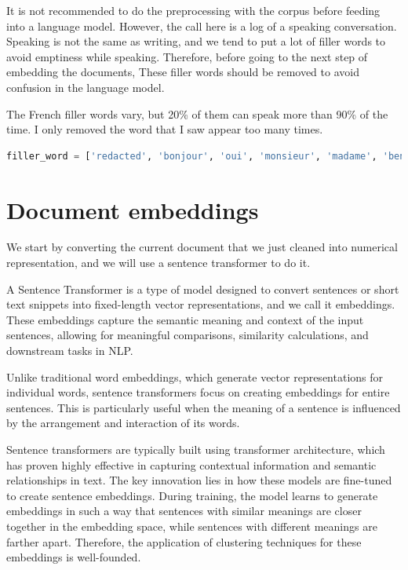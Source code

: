 It is not recommended to do the preprocessing with the corpus before feeding into a language model. However, the call here is a log of a speaking conversation. Speaking is not the same as writing, and we tend to put a lot of filler words to avoid emptiness while speaking. Therefore, before going to the next step of embedding the documents, These filler words should be removed to avoid confusion in the language model.

The French filler words vary, but 20\% of them can speak more than 90\% of the time. I only removed the word that I saw appear too many times.

\begin{lstlisting}[language=Python]
filler_word = ['redacted', 'bonjour', 'oui', 'monsieur', 'madame', 'ben', 'quelque', 'moment', 'justement', 'euh', 'non', 'hein', 'collègue', 'hein', 'allô', 'ah', 'alors', 'voilà', 'bah']
\end{lstlisting}

\section{Document embeddings}

We start by converting the current document that we just cleaned into numerical representation, and we will use a sentence transformer to do it.

A Sentence Transformer is a type of model designed to convert sentences or short text snippets into fixed-length vector representations, and we call it embeddings. These embeddings capture the semantic meaning and context of the input sentences, allowing for meaningful comparisons, similarity calculations, and downstream tasks in NLP.

Unlike traditional word embeddings, which generate vector representations for individual words, sentence transformers focus on creating embeddings for entire sentences. This is particularly useful when the meaning of a sentence is influenced by the arrangement and interaction of its words.

Sentence transformers are typically built using transformer architecture, which has proven highly effective in capturing contextual information and semantic relationships in text. The key innovation lies in how these models are fine-tuned to create sentence embeddings. During training, the model learns to generate embeddings in such a way that sentences with similar meanings are closer together in the embedding space, while sentences with different meanings are farther apart. Therefore, the application of clustering techniques for these embeddings is well-founded.

